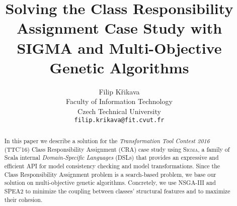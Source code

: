 \documentclass[a4paper]{article}
\title{Solving the \TTC Class Responsibility Assignment Case Study with SIGMA and Multi-Objective Genetic Algorithms}
\author{Filip Křikava\\ Faculty of Information Technology\\ Czech Technical University\\ \texttt{filip.krikava@fit.cvut.fr}}
\newcommand{\SIGMA}{\textsc{Sigma}\xspace}
\newcommand{\TTC}{TTC'16\xspace}
\begin{document}
\maketitle

\begin{abstract}
In this paper we describe a solution for the \emph{Transformation Tool Contest 2016} (\TTC) Class Responsibility Assignment (CRA) case study using \SIGMA, a family of Scala internal \emph{Domain-Specific Languages} (DSLs) that provides an expressive and efficient API for model consistency checking and model transformations.
Since the Class Responsibility Assignment problem is a search-based problem, we base our solution on multi-objective genetic algorithms.
Concretely, we use NSGA-III and SPEA2 to minimize the coupling between classes' structural features and to maximize their cohesion.
\end{abstract}







	

\appendix


\end{document}
